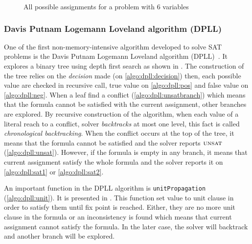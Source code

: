 \begin{figure}[!htbp]
 \centering
 
 \caption{All possible assignments for a problem with 6 variables}
 \label{fig:naive_algo}
\end{figure}

\subsubsection{Davis Putnam Logemann Loveland algorithm (DPLL)}\label{sec:dpll}
One of the first non-memory-intensive algorithm developed to solve SAT problems is 
the Davis Putnam Logemann Loveland algorithm (DPLL)~\cite{dpll_62}. 
It explores a binary tree using depth first search as shown in .
The construction of the tree  relies on the \emph{decision} made (on \cref{algo:dpll:decision}) then,
each possible value are checked in recursive call, true value on \cref{algo:dpll:pos} and false value 
on \cref{algo:dpll:neg}.
When a leaf find a conflict (\cref{algo:dpll:unsatbranch}) which means that the formula cannot be satisfied with
the current assignment, other branches are explored.
By recursive construction of the algorithm, when each value of a literal reach to a conflict,
solver \emph{backtracks} at most one level, this fact is called \emph{chronological backtracking}.
When the conflict occurs at the top of the tree, it means that the formula cannot be satisfied and the 
solver reports $\textsc{unsat}$ (\cref{algo:dpll:unsat}). However, if the formula is empty in any branch, 
it means that current assignment satisfy the whole formula and the solver reports it on \cref{algo:dpll:sat1}
or \ref{algo:dpll:sat2}.



An important function in the DPLL algorithm is \texttt{unitPropagation} (\cref{algo:dpll:unit}).
It is presented in . This function set value to unit clause in order to satisfy them
until fix point is reached. Either, they are no more unit clause in the formula or an inconsistency 
is found which means that current assignment cannot satisfy the formula. In the later case, the solver will
backtrack and another branch will be explored.



